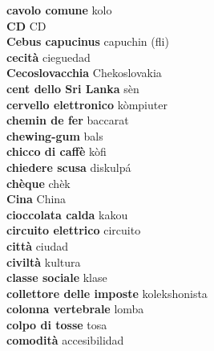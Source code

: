 \textbf{ cavolo comune  } kolo \\
\textbf{ CD  } CD \\
\textbf{ Cebus capucinus  } capuchin (fli) \\
\textbf{ cecità  } cieguedad \\
\textbf{ Cecoslovacchia  } Chekoslovakia \\
\textbf{ cent dello Sri Lanka  } sèn \\
\textbf{ cervello elettronico  } kòmpiuter \\
\textbf{ chemin de fer  } baccarat \\
\textbf{ chewing-gum  } bals \\
\textbf{ chicco di caffè  } kòfi \\
\textbf{ chiedere scusa  } diskulpá \\
\textbf{ chèque  } chèk \\
\textbf{ Cina  } China \\
\textbf{ cioccolata calda  } kakou \\
\textbf{ circuito elettrico  } circuito \\
\textbf{ città  } ciudad \\
\textbf{ civiltà  } kultura \\
\textbf{ classe sociale  } klase \\
\textbf{ collettore delle imposte  } kolekshonista \\
\textbf{ colonna vertebrale  } lomba \\
\textbf{ colpo di tosse  } tosa \\
\textbf{ comodità  } accesibilidad \\
